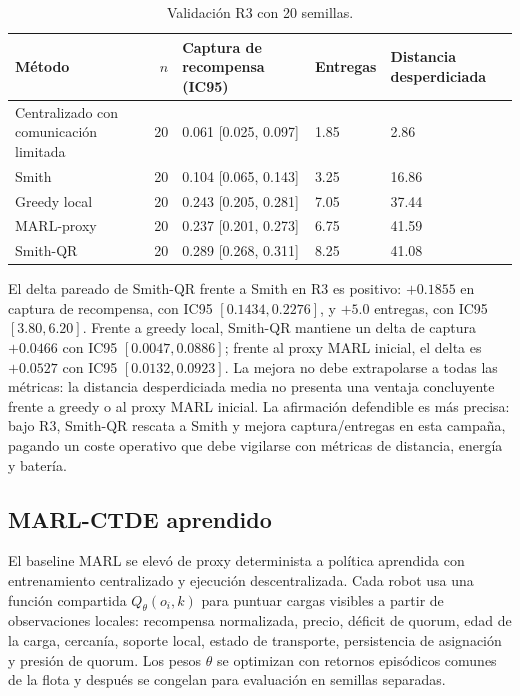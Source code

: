 \begin{table}[H]
\centering
\caption{Validación R3 con 20 semillas.}
\label{tab:smith-qr-r3}
\small
\begin{tabularx}{\textwidth}{@{}>{\raggedright\arraybackslash}Xrlll@{}}
\toprule
Método & $n$ & Captura de recompensa (IC95) & Entregas & Distancia desperdiciada \\
\midrule
Centralizado con comunicación limitada & 20 & 0.061 [0.025, 0.097] & 1.85 & 2.86 \\
Smith & 20 & 0.104 [0.065, 0.143] & 3.25 & 16.86 \\
Greedy local & 20 & 0.243 [0.205, 0.281] & 7.05 & 37.44 \\
MARL-proxy & 20 & 0.237 [0.201, 0.273] & 6.75 & 41.59 \\
Smith-QR & 20 & 0.289 [0.268, 0.311] & 8.25 & 41.08 \\
\bottomrule
\end{tabularx}
\end{table}

El delta pareado de Smith-QR frente a Smith en R3 es positivo:
$+0.1855$ en captura de recompensa, con IC95 $[0.1434,0.2276]$, y $+5.0$
entregas, con IC95 $[3.80,6.20]$. Frente a greedy local, Smith-QR mantiene un delta de
captura $+0.0466$ con IC95 $[0.0047,0.0886]$; frente al proxy MARL inicial, el delta es
$+0.0527$ con IC95 $[0.0132,0.0923]$. La mejora no debe extrapolarse a todas las
métricas: la distancia desperdiciada media no presenta una ventaja concluyente frente a
greedy o al proxy MARL inicial. La afirmación defendible es más precisa: bajo R3, Smith-QR rescata a
Smith y mejora captura/entregas en esta campaña, pagando un coste operativo que debe
vigilarse con métricas de distancia, energía y batería.

\subsection{MARL-CTDE aprendido}

El baseline MARL se elevó de proxy determinista a política aprendida con entrenamiento
centralizado y ejecución descentralizada. Cada robot usa una función compartida
$Q_\theta(o_i,k)$ para puntuar cargas visibles a partir de observaciones locales:
recompensa normalizada, precio, déficit de quorum, edad de la carga, cercanía, soporte
local, estado de transporte, persistencia de asignación y presión de quorum. Los pesos
$\theta$ se optimizan con retornos episódicos comunes de la flota y después se congelan
para evaluación en semillas separadas.

